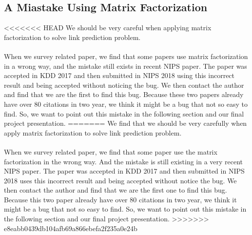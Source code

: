 \documentclass[12pt]{article}
\begin{document}
\subsection{A Miastake Using Matrix Factorization}
<<<<<<< HEAD
We should be very careful when applying matrix factorization to solve link prediction problem.
\\ \\
When we survey related paper, we find that some papers use matrix factorization in a wrong way, and the mistake still exists in recent NIPS paper. The paper was accepted in KDD 2017 and then submitted in NIPS 2018 using this incorrect result and being accepted without noticing the bug. We then contact the author and find that we are the first to find this bug. Because these two papers already have over 80 citations in two year, we think it might be a bug that not so easy to find. So, we want to point out this mistake in the following section and our final project presentation.   
=======
We find that we should be very carefully when apply matrix factorization to solve link prediction problem.
\\ \\
When we survey related paper, we find that some paper use the matrix factorization in the wrong way. And the mistake is still existing in a very recent NIPS paper. The paper was accepted in KDD 2017 and then submitted in NIPS 2018 uses this incorrect result and being accepted without notice the bug. We then contact the author and  find that we are the first one to find this bug. Because this two paper already have over 80 citations in two year, we think it might be a bug that not so easy to find. So, we want to point out this mistake in the following section and our final project presentation.   
>>>>>>> e8eabb0439db104afb69a866ebefa2f235a0e24b
\end{document}
